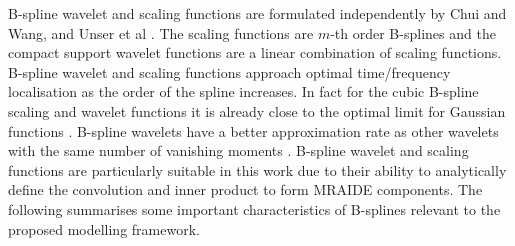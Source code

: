 \documentclass[11pt,draftcls,onecolumn,peerreview]{IEEEtran}
\begin{document}
B-spline wavelet and scaling functions are formulated independently by Chui and Wang, and Unser et al \cite{Chui1992b,Chui1992,Unser1993}.  The scaling functions are $m$-th order B-splines and the compact support wavelet functions are a linear combination of scaling functions. B-spline wavelet and scaling functions approach optimal time/frequency localisation as the order of the spline increases. In fact for the cubic B-spline scaling and wavelet functions it is already close to the optimal limit for Gaussian functions \cite{Unser1992}. B-spline wavelets have a better approximation rate as other wavelets with the same number of vanishing moments \cite{Unser1999}. B-spline wavelet and scaling functions are particularly suitable in this work due to their ability to analytically define the convolution and inner product to form  MRAIDE components. The following summarises some important characteristics of B-splines relevant to the proposed modelling framework. 
\end{document}
